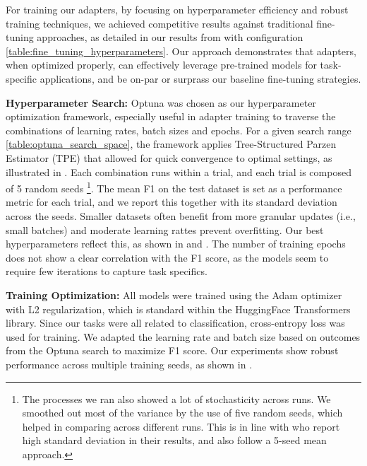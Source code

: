 \documentclass[10pt,twocolumn,letterpaper]{article}
\begin{document}
For training our adapters, by focusing on hyperparameter efficiency and robust training techniques, we achieved competitive results against traditional fine-tuning approaches, as detailed in our results from  with configuration \ref{table:fine_tuning_hyperparameters}. Our approach demonstrates that adapters, when optimized properly, can effectively leverage pre-trained models for task-specific applications, and be on-par or surprass our baseline fine-tuning strategies.

\textbf{Hyperparameter Search:} Optuna \cite{optuna} was chosen as our hyperparameter optimization framework, especially useful in adapter training to traverse the combinations of learning rates, batch sizes and epochs. For a given search range \ref{table:optuna_search_space}, the framework applies Tree-Structured Parzen Estimator (TPE) that allowed for quick convergence to optimal settings, as illustrated in . Each combination runs within a trial, and each trial is composed of 5 random seeds \footnote{The processes we ran also showed a lot of stochasticity across runs. We smoothed out most of the variance by the use of five random seeds, which helped in comparing across different runs. This is in line with \cite{allenai_dont_stop_pretraining} who report high standard deviation in their results, and also follow a 5-seed mean approach.}. The mean F1 on the test dataset is set as a performance metric for each trial, and we report this together with its standard deviation across the seeds. Smaller datasets often benefit from more granular updates (i.e., small batches) and moderate learning rattes prevent overfitting. Our best hyperparameters reflect this, as shown in  and
. The number of training epochs does not show a clear correlation with the F1 score, as the models seem to require few iterations to capture task specifics.

\textbf{Training Optimization:} All models were trained using the Adam optimizer with L2 regularization, which is standard within the HuggingFace Transformers library. Since our tasks were all related to classification, cross-entropy loss was used for training. We adapted the learning rate and batch size based on outcomes from the Optuna search to maximize F1 score. Our experiments show robust performance across multiple training seeds, as shown in .
\end{document}
